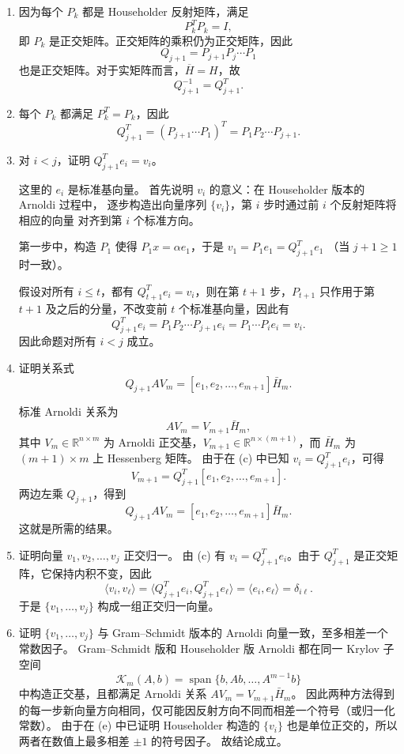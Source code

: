 \documentclass{ctexart}
\begin{document}
\begin{solution}
  \begin{enumerate}
    \item 因为每个 $P_k$ 都是 Householder 反射矩阵，满足
      \[
        P_k^T P_k = I,
      \]
      即 $P_k$ 是正交矩阵。正交矩阵的乘积仍为正交矩阵，因此
      \[
        Q_{j+1} = P_{j+1} P_j \cdots P_1
      \]
      也是正交矩阵。对于实矩阵而言，\(\overline{H}=H \)，故
      \[
        Q_{j+1}^{-1} = Q_{j+1}^T.
      \]
    \item 每个 $P_k$ 都满足 $P_k^T = P_k$，因此
      \[
        Q_{j+1}^T = (P_{j+1} \cdots P_1)^T = P_1 P_2 \cdots P_{j+1}.
      \]
    \item 对 $i < j$，证明 $Q_{j+1}^T e_i = v_i$。

      这里的 $e_i$ 是标准基向量。
      首先说明 $v_i$ 的意义：在 Householder 版本的 Arnoldi 过程中，
      逐步构造出向量序列 $\{v_i\}$，第 $i$ 步时通过前 $i$ 个反射矩阵将相应的向量
      对齐到第 $i$ 个标准方向。

      第一步中，构造 $P_1$ 使得 $P_1 x = \alpha e_1$，于是 $v_1 = P_1 e_1 = Q_{j+1}^T e_1$
      （当 $j+1 \ge 1$ 时一致）。

      假设对所有 $i \le t$，都有 $Q_{t+1}^T e_i = v_i$，则在第 $t+1$ 步，$P_{t+1}$ 只作用于第 $t+1$ 及之后的分量，不改变前 $t$ 个标准基向量，因此有
      \[
        Q_{j+1}^T e_i = P_1 P_2 \cdots P_{j+1} e_i = P_1 \cdots P_i e_i = v_i.
      \]
      因此命题对所有 $i < j$ 成立。
    \item 证明关系式
      \[
        Q_{j+1} A V_m = [e_1, e_2, \dots, e_{m+1}] \bar{H}_m.
      \]

      标准 Arnoldi 关系为
      \[
        A V_m = V_{m+1} \bar{H}_m,
      \]
      其中 $V_m \in \mathbb{R}^{n \times m}$ 为 Arnoldi 正交基，$V_{m+1} \in \mathbb{R}^{n \times (m+1)}$，而 $\bar{H}_m$ 为 $(m+1) \times m$ 上 Hessenberg 矩阵。
      由于在 (c) 中已知 $v_i = Q_{j+1}^T e_i$，可得
      \[
        V_{m+1} = Q_{j+1}^T [e_1, e_2, \dots, e_{m+1}].
      \]
      两边左乘 $Q_{j+1}$，得到
      \[
        Q_{j+1} A V_m = [e_1, e_2, \dots, e_{m+1}] \bar{H}_m.
      \]
      这就是所需的结果。
    \item 证明向量 $v_1, v_2, \dots, v_j$ 正交归一。
      由 (c) 有 $v_i = Q_{j+1}^T e_i$。由于 $Q_{j+1}^T$ 是正交矩阵，它保持内积不变，因此
      \[
        \langle v_i, v_\ell \rangle = \langle Q_{j+1}^T e_i, Q_{j+1}^T e_\ell \rangle
        = \langle e_i, e_\ell \rangle = \delta_{i\ell}.
      \]
      于是 $\{v_1, \dots, v_j\}$ 构成一组正交归一向量。
    \item 证明 $\{v_1, \dots, v_j\}$ 与 Gram–Schmidt 版本的 Arnoldi 向量一致，至多相差一个常数因子。
      Gram–Schmidt 版和 Householder 版 Arnoldi 都在同一 Krylov 子空间
      \[
        \mathcal{K}_m(A, b) = \operatorname{span}\{b, Ab, \dots, A^{m-1} b\}
      \]
      中构造正交基，且都满足 Arnoldi 关系 $A V_m = V_{m+1} \bar{H}_m$。
      因此两种方法得到的每一步新向量方向相同，仅可能因反射方向不同而相差一个符号（或归一化常数）。
      由于在 (e) 中已证明 Householder 构造的 $\{v_i\}$ 也是单位正交的，所以两者在数值上最多相差 $\pm 1$ 的符号因子。
      故结论成立。
  \end{enumerate}
\end{solution}
\end{document}
